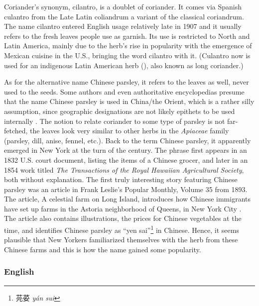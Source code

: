 Coriander’s synonym, cilantro, is a doublet of coriander. It comes via Spanish culantro from the Late Latin coliandrum a variant of the classical coriandrum. The name cilantro entered English usage relatively late in 1907 \parencite{harper_coriander_nodate} and it usually refers to the fresh leaves people use as garnish. Its use is restricted to North and Latin America, mainly due to the herb’s rise in popularity with the emergence of Mexican cuisine in the U.S., bringing the word cilantro with it. (Culantro now is used for an indigenous Latin American herb (), also known as long coriander.)

As for the alternative name Chinese parsley, it refers to the leaves as well, never used to the seeds. Some authors and even authoritative encyclopedias presume that the name Chinese parsley is used in China/the Orient, which is a rather silly assumption, since geographic designations are not likely epithets to be used internally \parencite[cf.][]{davidson_oxford_2014, oconnell_book_2016}. The notion to relate coriander to some type of parsley is not far-fetched, the leaves look very similar to other herbs in the \textit{Apiaceae} family (parsley, dill, anise, fennel, etc.). Back to the term Chinese parsley, it apparently emerged in New York at the turn of the century. The phrase first appears in an 1832 U.S. court document, listing the items of a Chinese grocer, and later in an 1854 work titled \textit{The Transactions of the Royal Hawaiian Agricultural Society}, both without explanation. The first truly interesting story featuring Chinese parsley was an article in Frank Leslie's Popular Monthly, Volume 35 from 1893. The article, A celestial farm on Long Island, introduces how Chinese immigrants have set up farms in the Astoria neighborhood of Queens, in New York City \parencite{seitz_celestial_1893} . The article also contains illustrations, the prices for Chinese vegetables at the time, and identifies Chinese parsley as ``yen sai''\footnote{芫荽 \textit{yán sui}} in Chinese. Hence, it seems plausible that New Yorkers familiarized themselves with the herb from these Chinese farms and this is how the name gained some popularity.



\subsubsection{English}



